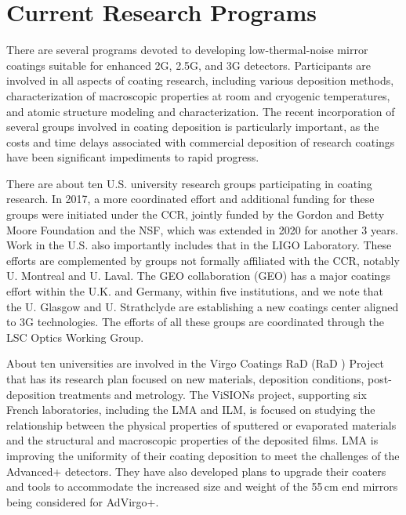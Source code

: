 \section{Current Research Programs}

There are several 
programs devoted to developing low-thermal-noise mirror coatings suitable for enhanced \ac{2G}, \ac{2.5G}, and \ac{3G} detectors. Participants are involved in all aspects of coating research, including various deposition methods, characterization of macroscopic properties at room and cryogenic temperatures, and atomic structure modeling and characterization. The recent incorporation 
of several groups involved in coating deposition is particularly important, as the costs and time delays associated with commercial deposition of research coatings have been significant impediments to rapid progress.

There are about ten U.S. university research groups participating in coating research. In 2017, a more coordinated effort and additional funding for these groups were initiated under the \ac{CCR}, jointly funded by the Gordon and Betty Moore Foundation and the NSF, which was extended in 2020 for another 3 years. Work in the U.S. also importantly includes that in the \ac{LIGO} Laboratory. These efforts are complemented by groups not formally affiliated with the \ac{CCR}, notably U. Montreal and U. Laval. The GEO collaboration (GEO) has a major coatings effort within the U.K. and Germany, within five institutions, and we note that the U. Glasgow and U. Strathclyde are establishing a new coatings center aligned to 3G technologies. The efforts of all these groups are coordinated through the \ac{LSC} Optics Working Group.

About ten universities are involved in the Virgo Coatings \ac{RaD}   (\ac{RaD}  ) Project that has its research plan focused on new materials, deposition conditions, post-deposition treatments and metrology. The \acs*{ViSIONs} project, supporting six French laboratories, including the \ac{LMA} and \ac{ILM}, is focused on studying the relationship between the physical properties of sputtered or evaporated materials and the structural and macroscopic properties of the deposited films. 
\ac{LMA} is improving the uniformity of their coating deposition to meet the challenges of the Advanced+ detectors. They have also developed plans to upgrade their coaters and tools to accommodate the increased size and weight of the 55\,cm end mirrors being considered for \ac{AdVirgo+}.

